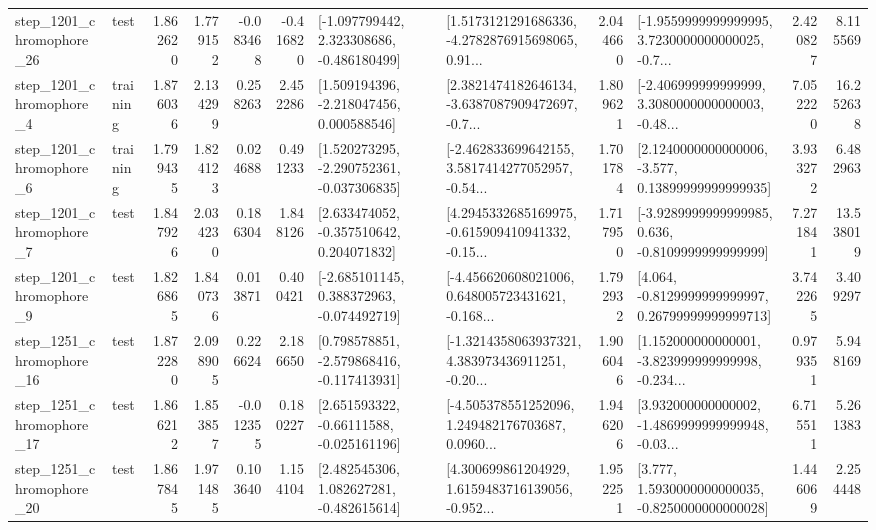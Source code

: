\begin{tabular}{llrrrrllrlrr}
 step\_1201\_chromophore\_26 &      test &      1.862620 &    1.779152 &     -0.083468 & -0.416820 &   [-1.097799442, 2.323308686, -0.486180499] &  [1.5173121291686336, -4.2782876915698065, 0.91... &       2.044660 &  [-1.9559999999999995, 3.7230000000000025, -0.7... &            2.420827 &          8.115569 \\
  step\_1201\_chromophore\_4 &  training &      1.876036 &    2.134299 &      0.258263 &  2.452286 &    [1.509194396, -2.218047456, 0.000588546] &  [2.3821474182646134, -3.6387087909472697, -0.7... &       1.809621 &  [-2.406999999999999, 3.3080000000000003, -0.48... &            7.052220 &         16.252638 \\
  step\_1201\_chromophore\_6 &  training &      1.799435 &    1.824123 &      0.024688 &  0.491233 &   [1.520273295, -2.290752361, -0.037306835] &  [-2.462833699642155, 3.5817414277052957, -0.54... &       1.701784 &  [2.1240000000000006, -3.577, 0.13899999999999935] &            3.933272 &          6.482963 \\
  step\_1201\_chromophore\_7 &      test &      1.847926 &    2.034230 &      0.186304 &  1.848126 &    [2.633474052, -0.357510642, 0.204071832] &  [4.2945332685169975, -0.615909410941332, -0.15... &       1.717950 &  [-3.9289999999999985, 0.636, -0.8109999999999999] &            7.271841 &         13.538019 \\
  step\_1201\_chromophore\_9 &      test &      1.826865 &    1.840736 &      0.013871 &  0.400421 &   [-2.685101145, 0.388372963, -0.074492719] &  [-4.456620608021006, 0.648005723431621, -0.168... &       1.792932 &  [4.064, -0.8129999999999997, 0.26799999999999713] &            3.742265 &          3.409297 \\
 step\_1251\_chromophore\_16 &      test &      1.872280 &    2.098905 &      0.226624 &  2.186650 &   [0.798578851, -2.579868416, -0.117413931] &  [-1.3214358063937321, 4.383973436911251, -0.20... &       1.906046 &  [1.152000000000001, -3.823999999999998, -0.234... &            0.979351 &          5.948169 \\
 step\_1251\_chromophore\_17 &      test &      1.866212 &    1.853857 &     -0.012355 &  0.180227 &    [2.651593322, -0.66111588, -0.025161196] &  [-4.505378551252096, 1.249482176703687, 0.0960... &       1.946206 &  [3.932000000000002, -1.4869999999999948, -0.03... &            6.715511 &          5.261383 \\
 step\_1251\_chromophore\_20 &      test &      1.867845 &    1.971485 &      0.103640 &  1.154104 &    [2.482545306, 1.082627281, -0.482615614] &  [4.300699861204929, 1.6159483716139056, -0.952... &       1.952251 &   [3.777, 1.5930000000000035, -0.8250000000000028] &            1.446069 &          2.254448 \\

\end{tabular}
